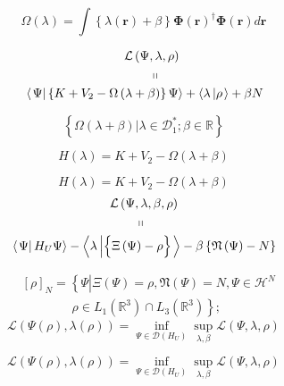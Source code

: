 \documentclass[prl,twocolumn]{revtex4}%
\begin{document}
\[
\Omega\left(  \lambda\right)  =\int\left\{  \lambda\left(  \mathbf{r}\right)
+\beta\right\}  \mathbf{\Phi}\left(  \mathbf{r}\right)  ^{\dagger}%
\mathbf{\Phi}\left(  \mathbf{r}\right)  d\mathbf{r}%
\]
%

\begin{align*}
&  \qquad\qquad\qquad\qquad\mathcal{L}\left(  \Psi,\lambda,\rho\right) \\
&  \qquad\qquad\qquad\qquad\qquad\left.  \shortparallel\right. \\
&  \left\langle \left.  \Psi\right\vert \left\{  K+V_{2}-\Omega\left(
\lambda+\beta\right)  \right\}  \Psi\right\rangle +\left\langle \lambda
\left\vert \rho\right.  \right\rangle +\beta N
\end{align*}
%

\[
\left\{  \left.  \Omega\left(  \lambda+\beta\right)  \right\vert \lambda
\in\mathcal{D}_{1}^{\ast};\beta\in\mathbb{R}\right\}
\]
%

\[
H\left(  \lambda\right)  =K+V_{2}-\Omega\left(  \lambda+\beta\right)
\]
%

\[
H\left(  \lambda\right)  =K+V_{2}-\Omega\left(  \lambda+\beta\right)
\]%
\begin{align*}
&  \qquad\qquad\qquad\qquad\mathcal{L}\left(  \Psi,\lambda,\beta,\rho\right)
\\
&  \qquad\qquad\qquad\qquad\qquad\left.  \shortparallel\right. \\
&  \left\langle \left.  \Psi\right\vert H_{U}\Psi\right\rangle -\left\langle
\lambda\left\vert \left\{  \overset{}{\Xi\left(  \Psi\right)  -\rho}\right\}
\right.  \right\rangle -\beta\left\{  \mathfrak{N}\left(  \Psi\right)
-N\right\}
\end{align*}
%

\begin{align*}
&  \left[  \rho\right]  _{N}=\left\{  \left.  \overset{}{\Psi}\right\vert
\Xi\left(  \Psi\right)  =\rho,\mathfrak{N}\left(  \Psi\right)  =N,\Psi
\in\mathcal{H}^{N}\right. \\
&  \qquad\qquad\left.  \rho\in L_{1}\left(  \mathbb{R}^{3}\right)  \cap
L_{3}\left(  \mathbb{R}^{3}\right)  \underset{}{}\right\}  ;
\end{align*}%
\[
\mathcal{L}\left(  \Psi\left(  \rho\right)  ,\lambda\left(  \rho\right)
\right)  =\inf_{\Psi\in\mathcal{D}\left(  H_{U}\right)  }\sup_{\lambda,\beta
}\mathcal{L}\left(  \Psi,\lambda,\rho\right)
\]
%

\[
\mathcal{L}\left(  \Psi\left(  \rho\right)  ,\lambda\left(  \rho\right)
\right)  =\inf_{\Psi\in\mathcal{D}\left(  H_{U}\right)  }\sup_{\lambda,\beta
}\mathcal{L}\left(  \Psi,\lambda,\rho\right)
\]
\end{document}
